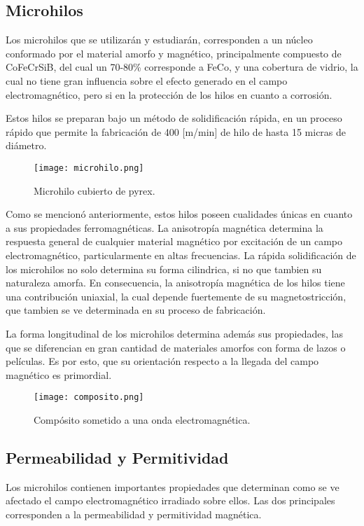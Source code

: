 \documentclass[12pt,letterpaper]{article}
\numberwithin{equation}{section}
\begin{document}
\subsection{Microhilos}

Los microhilos que se utilizarán y estudiarán, corresponden a un núcleo conformado por el material amorfo y magnético, principalmente compuesto de CoFeCrSiB, del cual un 70-80\% corresponde a FeCo, y una cobertura de vidrio, la cual no tiene gran influencia sobre el efecto generado en el campo electromagnético, pero si en la protección de los hilos en cuanto a corrosión.

Estos hilos se preparan bajo un método de solidificación rápida, en un proceso rápido que permite la fabricación de 400 [m/min] de hilo de hasta 15 micras de diámetro.

\begin{figure}[H]
	\centering\texttt{[image: microhilo.png]}
	\caption{Microhilo cubierto de pyrex.}
\end{figure}


Como se mencionó anteriormente, estos hilos poseen cualidades únicas en cuanto a sus propiedades ferromagnéticas. La anisotropía magnética determina la respuesta general de cualquier material magnético por excitación de un campo electromagnético, particularmente en altas frecuencias. La rápida solidificación de los microhilos no solo determina su forma cilindrica, si no que tambien su naturaleza amorfa. En consecuencia, la anisotropía magnética de los hilos tiene una contribución uniaxial, la cual depende fuertemente de su magnetostricción, que tambien se ve determinada en su proceso de fabricación.

La forma longitudinal de los microhilos determina además sus propiedades, las que se diferencian en gran cantidad de materiales amorfos con forma de lazos o películas. Es por esto, que su orientación respecto a la llegada del campo magnético es primordial.

\begin{figure}[H]
	\centering\texttt{[image: composito.png]}
	\caption{Compósito sometido a una onda electromagnética.}
	\label{fig: composito}
\end{figure} 

\subsection{Permeabilidad y Permitividad}

Los microhilos contienen importantes propiedades que determinan como se ve afectado el campo electromagnético irradiado sobre ellos. Las dos principales corresponden a la permeabilidad y permitividad magnética. 
\end{document}
